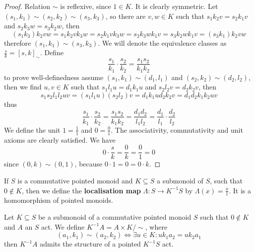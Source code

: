 \begin{proof}[Proof]
    Relation $\sim$ is reflexive, since $1\in K$. It is clearly symmetric. 
    Let $(s_1,k_1)\sim(s_2,k_2)\sim(s_3,k_3)$, so there are $v,w\in K$ such that 
    $s_1k_2v = s_2k_1v$ and $s_2k_3w = s_3k_2w$, then 
    \[
    (s_1k_3)k_2vw = s_1k_2vk_3w = s_2k_1vk_3w = s_2k_3wk_1v = s_3k_2wk_1v = (s_3k_1)k_2vw
    \]
    therefore $(s_1,k_1)\sim(s_3,k_3)$. We will denote the equivalence classes as
    $\frac{s}{k} = [s,k]_{\sim}$. Define 
    \[
        \frac{s_1}{k_1}\cdot\frac{s_2}{k_2} = \frac{s_1 s_2}{k_1 k_2}
    \]
    to prove well-definedness assume $(s_1,k_1)\sim(d_1,l_1)$ and $(s_2,k_2)\sim(d_2,l_2)$, then 
    we find $u,v\in K$ such that 
    $s_1l_1u=d_1k_1u$ and $s_2l_2v = d_2k_2v$, then 
    \[
    s_1s_2l_1l_2uv = (s_1l_1u)(s_2l_2)v = d_1k_1ud_2k_2v = d_1d_2k_1k_2uv 
    \]
    thus
    \[
        \frac{s_1}{k_1}\cdot\frac{s_2}{k_2} = \frac{s_1s_2}{k_1k_2} = \frac{d_1d_2}{l_1l_2} = \frac{d_1}{l_1}\cdot\frac{d_2}{l_2}
    \]
    We define the unit $1 = \frac{1}{1}$ and $0 = \frac{0}{1}$. The associativity, commutativity and unit axioms are clearly 
    satisfied. We have 
    \[
        0\cdot\frac{s}{k} = \frac{0}{k} = \frac{0}{1} = 0
    \]
    since $(0,k)\sim(0,1)$, because $0\cdot 1 = 0 = 0\cdot k$. 
\end{proof}
\begin{definition}
    If $S$ is a commutative pointed monoid and $K\subseteq S$ a submonoid of $S$, such that $0\not\in K$, then we define the \textbf{localisation map} $\Lambda: S \to K^{-1}S$ by $\Lambda(x) = \frac{x}{1}$. It is a 
    homomorphism of pointed monoids.  
\end{definition}
\begin{proposition}
    Let $K\subseteq S$ be a submonoid of a commutative pointed monoid $S$ such that $0\not\in K$ and $A$ an $S$ act. We define 
    $K^{-1}A = A\times K/\sim$, where 
    \[
        (a_1,k_1)\sim(a_2,k_2) \iff \exists u\in K : uk_1 a_2 = uk_2 a_1
    \]
    then $K^{-1}A$ admits the structure of a pointed $K^{-1} S$ act.
\end{proposition}
